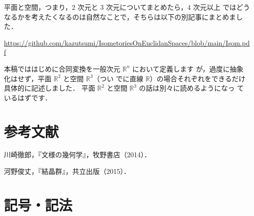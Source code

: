 \documentclass[11pt, uplatex, dvipdfmx, titlepage]{jsarticle}
\theoremstyle{definition}
\begin{document}
平面と空間，つまり，$2$ 次元と $3$ 次元についてまとめたら，$4$ 次元以上
ではどうなるかを考えたくなるのは自然なことで，そちらは以下の別記事にまとめました．
\begin{center}
  \url{https://github.com/kazutsumi/IsometoriesOnEuclidanSpaces/blob/main/Isom.pdf}
\end{center}

本稿でははじめに合同変換を一般次元 $\mathbb{R}^n$ において定義します
が，過度に抽象化はせず，平面 $\mathbb{R}^2$ と空間 $\mathbb{R}^3$（つい
でに直線 $\mathbb{R}$）の場合それぞれをできるだけ具体的に記述しました．
平面 $\mathbb{R}^2$ と空間 $\mathbb{R}^3$ の話は別々に読めるようになっ
ているはずです．

\section*{参考文献}
\begin{enumerate}[{[}1{]}]
 川崎徹郎，『文様の幾何学』，牧野書店（2014）．

 河野俊丈，『結晶群』，共立出版（2015）．

\end{enumerate}

 
 \newpage

 \section*{記号・記法}
\end{document}
